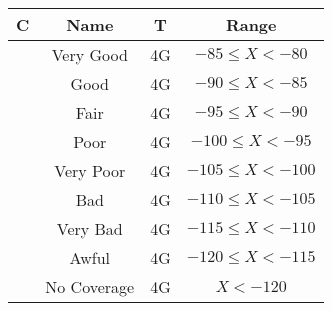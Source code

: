 \begin{tabular}{|c|c|c|c|}\hline
\rowcolor{Plum!20}
C&Name&T&Range\\\hline\hline
\rowcolor{White}\cellcolor[HTML]{00a032} &Very Good&4G&$-85\leq X<-80$\\\hline
\rowcolor{Gray!20}\cellcolor[HTML]{00d228} &Good&4G&$-90\leq X<-85$\\\hline
\rowcolor{White}\cellcolor[HTML]{ffff00} &Fair&4G&$-95\leq X<-90$\\\hline
\rowcolor{Gray!20}\cellcolor[HTML]{ffaa00} &Poor&4G&$-100\leq X<-95$\\\hline
\rowcolor{White}\cellcolor[HTML]{fa6400} &Very Poor&4G&$-105\leq X<-100$\\\hline
\rowcolor{Gray!20}\cellcolor[HTML]{ff0000} &Bad&4G&$-110\leq X<-105$\\\hline
\rowcolor{White}\cellcolor[HTML]{dc143c} &Very Bad&4G&$-115\leq X<-110$\\\hline
\rowcolor{Gray!20}\cellcolor[HTML]{820000} &Awful&4G&$-120\leq X<-115$\\\hline
\rowcolor{White}\cellcolor[HTML]{aaaaaa} &No Coverage&4G&$X<-120$\\\hline
\end{tabular}

